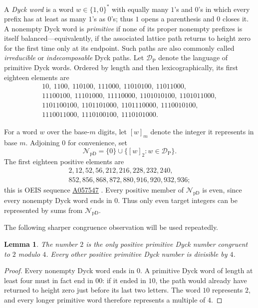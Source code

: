 \documentclass[12pt]{article}
\theoremstyle{plain}
\newtheorem{lemma}[theorem]{Lemma}
\theoremstyle{definition}
\theoremstyle{plain}
\newcommand{\val}[2]{[#1]_{#2}}
\newcommand{\NpD}{\mathcal{N}_{\mathrm{pD}}}
\newcommand{\DP}{\mathcal{D}_{\mathrm{P}}}
\newcommand{\seqnum}[1]{\href{https://oeis.org/#1}{\rm \underline{#1}}}
\begin{document}
A \emph{Dyck word} is a word $w\in\{1,0\}^*$ with equally many $1$'s
and $0$'s in which every prefix has at least as many $1$'s as $0$'s;
thus $1$ opens a parenthesis and $0$ closes it.  A nonempty Dyck word is
\emph{primitive} if none of its proper nonempty prefixes is itself
balanced---equivalently, if the associated lattice path returns to
height zero for the first time only at its endpoint.  Such paths are
also commonly called \emph{irreducible} or \emph{indecomposable} Dyck
paths.  Let $\DP$ denote the language
of primitive Dyck words.  Ordered by length and then lexicographically,
its first eighteen elements are
\[
\begin{gathered}
10,\ 1100,\ 110100,\ 111000,\ 11010100,\ 11011000,\\
11100100,\ 11101000,\ 11110000,\ 1101010100,\ 1101011000,\\
1101100100,\ 1101101000,\ 1101110000,\ 1110010100,\\
1110011000,\ 1110100100,\ 1110101000.
\end{gathered}
\]

For a word $w$ over the base-$m$ digits, let $\val{w}{m}$ denote the
integer it represents in base $m$.  Adjoining $0$ for convenience, set
\[
 \NpD=\{0\}\cup\{\val{w}{2}:w\in\DP\}.
\]
The first eighteen positive elements are
\[
\begin{gathered}
2,12,52,56,212,216,228,232,240,\\
852,856,868,872,880,916,920,932,936;
\end{gathered}
\]
this is OEIS sequence \seqnum{A057547} \cite{OEIS-A057547}.  Every positive member of
$\NpD$ is even, since every nonempty Dyck word ends in $0$.  Thus only
even target integers can be represented by sums from $\NpD$.

The following sharper congruence observation will be used repeatedly.

\begin{lemma}\label{lem:mod4}
The number $2$ is the only positive primitive Dyck number congruent to
$2$ modulo $4$.  Every other positive primitive Dyck number is divisible
by $4$.
\end{lemma}

\begin{proof}
Every nonempty Dyck word ends in $0$.  A primitive Dyck word of length at
least four must in fact end in $00$: if it ended in $10$, the path would
already have returned to height zero just before its last two letters.
The word $10$ represents $2$, and every longer primitive word therefore
represents a multiple of $4$.
\end{proof}
\end{document}
